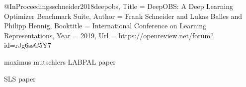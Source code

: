 @InProceedings{schneider2018deepobs,
Title = {Deep{OBS}: A Deep Learning Optimizer Benchmark Suite},
Author = {Frank Schneider and Lukas Balles and Philipp Hennig},
Booktitle = {International Conference on Learning Representations},
Year = {2019},
Url = {https://openreview.net/forum?id=rJg6ssC5Y7}
}

maximus mutschlers LABPAL paper

SLS paper